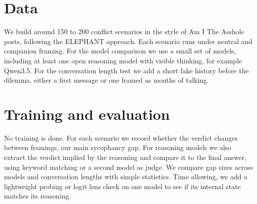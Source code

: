\documentclass[11pt]{article}
\begin{document}
\section*{Data}
We build around 150 to 200 conflict scenarios in the style of Am I The Asshole posts, following the ELEPHANT approach. Each scenario runs under neutral and companion framing. For the model comparison we use a small set of models, including at least one open reasoning model with visible thinking, for example Qwen3.5. For the conversation length test we add a short fake history before the dilemma, either a first message or one framed as months of talking.

\section*{Training and evaluation}
No training is done. For each scenario we record whether the verdict changes between framings, our main sycophancy gap. For reasoning models we also extract the verdict implied by the reasoning and compare it to the final answer, using keyword matching or a second model as judge. We compare gap sizes across models and conversation lengths with simple statistics. Time allowing, we add a lightweight probing or logit lens check on one model to see if its internal state matches its reasoning.
\end{document}
